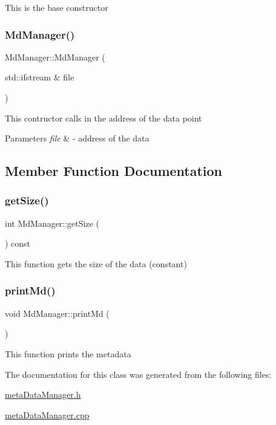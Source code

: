 This is the base constructor \mbox{\label{classMdManager_a9a04c96ea303f2e8d18275ba75af2551}} 
\subsubsection{\texorpdfstring{Md\+Manager()}{MdManager()}\hspace{0.1cm}{\footnotesize\ttfamily [2/2]}}
{\footnotesize\ttfamily Md\+Manager\+::\+Md\+Manager (\begin{DoxyParamCaption}\item[{std\+::ifstream \&}]{file }\end{DoxyParamCaption})}

This contructor calls in the address of the data point 
\begin{DoxyParams}{Parameters}
{\em file} & -\/ address of the data \\
\hline
\end{DoxyParams}


\subsection{Member Function Documentation}
\mbox{\label{classMdManager_a45e38a55df629208bb6727e10de5ca2c}} 
\subsubsection{\texorpdfstring{get\+Size()}{getSize()}}
{\footnotesize\ttfamily int Md\+Manager\+::get\+Size (\begin{DoxyParamCaption}{ }\end{DoxyParamCaption}) const}

This function gets the size of the data (constant) \mbox{\label{classMdManager_af9a631c2934e89728ae34be82f78e7fe}} 
\subsubsection{\texorpdfstring{print\+Md()}{printMd()}}
{\footnotesize\ttfamily void Md\+Manager\+::print\+Md (\begin{DoxyParamCaption}{ }\end{DoxyParamCaption})}

This function prints the metadata 

The documentation for this class was generated from the following files\+:\begin{DoxyCompactItemize}
\item 
\hyperlink{metaDataManager_8h}{meta\+Data\+Manager.\+h}\item 
\hyperlink{metaDataManager_8cpp}{meta\+Data\+Manager.\+cpp}\end{DoxyCompactItemize}

